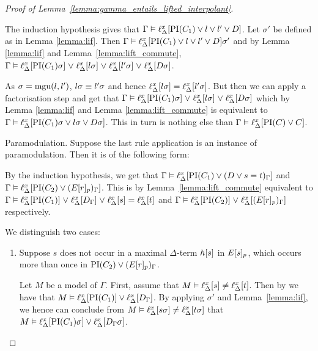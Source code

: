 \begin{proof}[Proof of Lemma~\ref{lemma:gamma_entails_lifted_interpolant}]
\begin{description}
			The induction hypothesis gives that
			$\Gamma \vDash \ell_{\Delta}^{x}[\operatorname{PI}(C_1) \lor l \lor l' \lor D]$.
			Let $\sigma'$ be defined as in Lemma \ref{lemma:lif}.
			Then $\Gamma \vDash \ell_{\Delta}^{x}[\operatorname{PI}(C_1) \lor l \lor l' \lor D]\sigma'$ and by Lemma \ref{lemma:lif} and Lemma~\ref{lemma:lift_commute},
			$\Gamma \vDash \ell_{\Delta}^{x}[\operatorname{PI}(C_1)\sigma] \;{\lor}\; \ell_{\Delta}^{x}[l\sigma] \;{\lor}\; \ell_{\Delta}^{x}[l'\sigma] \;{\lor}\; \ell_{\Delta}^{x}[D\sigma]$.

			As $\sigma = \operatorname{mgu}(l, l')$, $l\sigma \equiv l'\sigma$ and hence $\ell_{\Delta}^{x}[l\sigma] = \ell_{\Delta}^{x}[l'\sigma]$.
			But then we can apply a factorisation step and get that
			$\Gamma \vDash \ell_{\Delta}^{x}[\operatorname{PI}(C_1)\sigma] \;{\lor}\; \ell_{\Delta}^{x}[l\sigma] \;{\lor}\; \ell_{\Delta}^{x}[D\sigma]$
			which by Lemma \ref{lemma:lif} and Lemma \ref{lemma:lift_commute} is equivalent to 
			$\Gamma \entails\nolinebreak \lifdelta{\PI(C_1)\sigma \lor l\sigma \lor D\sigma}$.
			This in turn is nothing else than $\Gamma \vDash \ell_{\Delta}^{x}[\operatorname{PI}(C) \lor C]$.

		\item{Paramodulation.}
			Suppose the last rule application is an instance of paramodulation. Then it is of the following form:
			\begin{prooftree}
			\end{prooftree}
			By the induction hypothesis, we get that 
			$\Gamma \vDash \ell_{\Delta}^{x}[\operatorname{PI}(C_1) \lor (D\lor s=t)_\Gamma]$ and 
			$\Gamma \vDash \ell_{\Delta}^{x}[\operatorname{PI}(C_2) \lor (E{[r]_{p}})_\Gamma]$.
			This is by Lemma~\ref{lemma:lift_commute} equivalent to
			\markA{} $\Gamma \vDash \ell_{\Delta}^{x}[\operatorname{PI}(C_1)] \;{\lor}\;\allowbreak \ell_{\Delta}^{x}[D_\Gamma] \;{\lor}\; \ell_{\Delta}^{x}[s] = \ell_{\Delta}^{x}[t]$
			and \markB{} 
			$\Gamma \vDash \ell_{\Delta}^{x}[\operatorname{PI}(C_2)] \;{\lor}\; \ell_{\Delta}^{x}[(E{[r]_{p}})_\Gamma]$ respectively.


			We distinguish two cases:\nopagebreak
			\begin{enumerate}
				\item Suppose $s$ does not occur in a maximal $\Delta$-term $h[s]$ in $E{[s]_{p}}$, which occurs more than once in $\operatorname{PI}(C_2) \lor (E{[r]_{p}})_\Gamma$.
					\label{klehjy}

					Let $M$ be a model of $\Gamma$.
					First, assume that $M \vDash \ell_{\Delta}^{x}[s] \neq \ell_{\Delta}^{x}[t]$.
					Then by \markA{} we have that $M \vDash \ell_{\Delta}^{x}[\operatorname{PI}(C_1)] \lor \ell_{\Delta}^{x}[D_\Gamma]$.
					By applying $\sigma'$ and Lemma~\ref{lemma:lif}, we hence can conclude from 
					$M \vDash \ell_{\Delta}^{x}[s\sigma] \neq \ell_{\Delta}^{x}[t\sigma]$ that 
					$M \vDash \ell_{\Delta}^{x}[\operatorname{PI}(C_1)\sigma] \lor \ell_{\Delta}^{x}[D_\Gamma\sigma]$.



\end{enumerate}
\end{description}
\end{proof}
